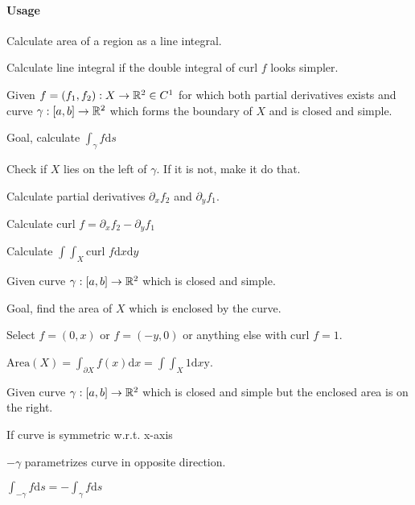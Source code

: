 \paragraph{Usage}
\begin{compactenum}
    \item Calculate area of a region as a line integral.
    \item Calculate line integral if the double integral of $\text{curl }f$ looks simpler.
\end{compactenum}

Given $f = (f_1, f_2): X \to \mathbb{R}^2 \in C^1$ for which both partial derivatives exists and curve $\gamma: [a,  b] \to \mathbb{R}^2$ which forms the boundary of $X$ and is closed and simple.

Goal, calculate $\int_{\gamma} f \mathrm{d}s$

\begin{compactenum}
    \item Check if $X$ lies on the left of $\gamma$. If it is not, make it do that.
    \item Calculate partial derivatives $\partial_x f_2$ and $\partial_y f_1$.
    \item Calculate $\text{curl }f = \partial_x f_2 - \partial_y f_1$
    \item Calculate $\int \int_X \text{curl }f \mathrm{d}x\mathrm{d}y$
\end{compactenum}

Given curve $\gamma: [a,  b] \to \mathbb{R}^2$ which is closed and simple.

Goal, find the area of $X$ which is enclosed by the curve.

\begin{compactenum}
\item Select $f = (0, x)$ or $f = (-y, 0)$ or anything else with $\text{curl }f = 1$.
    \item $\text{Area}(X) = \int_{\partial X} f(x) \mathrm{d}x = \int\int_X 1 \mathrm{d}x\mathrm{y}$.
\end{compactenum}

Given curve $\gamma: [a,  b] \to \mathbb{R}^2$ which is closed and simple but the enclosed area is on the right.

\begin{compactitem}
    \item If curve is symmetric w.r.t. x-axis
        \begin{compactitem}
            \item $-\gamma$ parametrizes curve in opposite direction.
            \item $\int_{-\gamma} f \mathrm{d}s = - \int_{\gamma} f \mathrm{d}s$
        \end{compactitem}
\end{compactitem}

